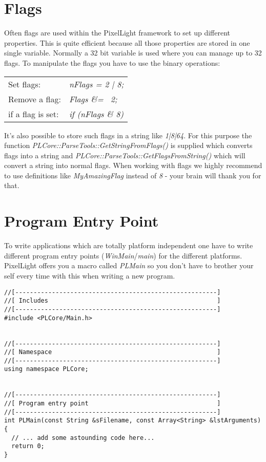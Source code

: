 \section{Flags}
Often flags are used within the PixelLight framework to set up different properties. This is quite efficient because all those properties are stored in one single variable. Normally a 32 bit variable is used where you can manage up to 32 flags. To manipulate the flags you have to use the binary operations:
\begin{tabular}{ll}
Set flags:&
  \emph{nFlags = 2 | 8;}\\
Remove a flag:&
  \emph{Flags \&= ~2;}\\
if a flag is set:&
  \emph{if (nFlags \& 8)}\\
\end{tabular}
It's also possible to store such flags in a string like \emph{1|8|64}. For this purpose the function \emph{PLCore::ParseTools::GetStringFromFlags()} is supplied which converts flags into a string and \emph{PLCore::ParseTools::GetFlagsFromString()} which will convert a string into normal flags. When working with flags we highly recommend to use definitions like \emph{MyAmazingFlag} instead of \emph{8} - your brain will thank you for that.




\section{Program Entry Point}
To write applications which are totally platform independent one have to write different program entry points (\emph{WinMain}/\emph{main}) for the different platforms. PixelLight offers you a macro called \emph{PLMain} so you don't have to brother your self every time with this when writing a new program.

\begin{lstlisting}[caption=Program entry point example]
//[-------------------------------------------------------]
//[ Includes                                              ]
//[-------------------------------------------------------]
#include <PLCore/Main.h>


//[-------------------------------------------------------]
//[ Namespace                                             ]
//[-------------------------------------------------------]
using namespace PLCore;


//[-------------------------------------------------------]
//[ Program entry point                                   ]
//[-------------------------------------------------------]
int PLMain(const String &sFilename, const Array<String> &lstArguments)
{
  // ... add some astounding code here...
  return 0;
}
\end{lstlisting}

